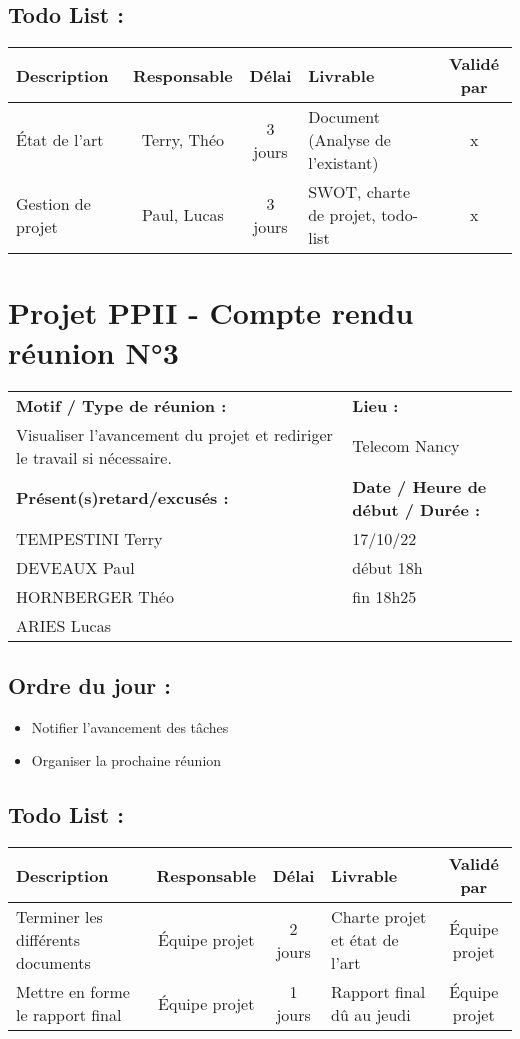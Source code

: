 \documentclass[12pt,titlepage]{report}
\begin{document}
\subsection*{Todo List :}
\begin{tabular}{|p{3.5cm}|c|c|p{4.5cm}|c|}
    \hline 
    Description & Responsable & Délai & Livrable & Validé par 
    \\ \hline
    État de l’art & Terry, Théo & 3 jours &Document (Analyse de l’existant) & x
    \\ \hline
    Gestion de projet & Paul, Lucas & 3 jours & SWOT, charte de projet, todo-list & x
    \\ \hline
\end{tabular}
\newpage

\section*{Projet PPII - Compte rendu réunion N°3}
\begin{tabular}{|p{7cm}|p{6cm}|}
    \hline
    \textbf{Motif / Type de réunion :}
    & \textbf{Lieu :}
    \\
    Visualiser l'avancement du projet et rediriger le travail si nécessaire.
    & 
    Telecom Nancy
    \\ \hline
    \textbf{Présent(s)retard/excusés :}
    &
    \textbf{Date / Heure de début / Durée :}
    \\ 
    TEMPESTINI Terry &  17/10/22\\  
    DEVEAUX Paul & début 18h\\
    HORNBERGER Théo & fin 18h25\\
    ARIES Lucas & 
    \\ \hline
\end{tabular}

\subsection*{Ordre du jour :}
\begin{itemize}
    \item{Notifier l'avancement des tâches}
    \item{Organiser la prochaine réunion}
\end{itemize}

\subsection*{Todo List :}
\begin{tabular}{|p{3.5cm}|c|c|p{4.5cm}|c|}
    \hline 
    Description & Responsable & Délai & Livrable & Validé par 
    \\ \hline
    Terminer les différents documents & Équipe projet & 2 jours & Charte projet et état de l'art & Équipe projet
    \\ \hline
    Mettre en forme le rapport final & Équipe projet & 1 jours & Rapport final dû au jeudi & Équipe projet
    \\ \hline
\end{tabular}
\newpage
\end{document}
